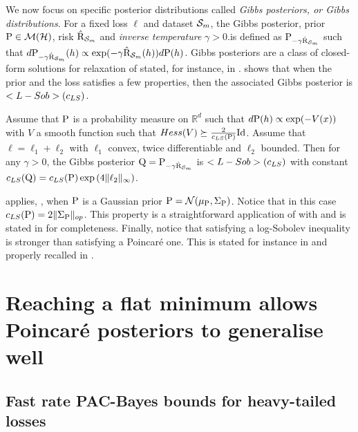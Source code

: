 We now focus on specific posterior distributions called \emph{Gibbs posteriors, or Gibbs distributions}.
For a fixed loss $\ell$ and dataset $\S_m$, the Gibbs posterior, \wrt prior $\P\in\Mcal(\Hcal)$, risk $\hat{\Risk}_{\S_m}$ and \emph{inverse temperature} $\gamma>0$.is defined as $\P_{-\gamma \hat{\Risk}_{\S_m}}$ such that  $d\P_{-\gamma \hat{\Risk}_{\S_m}}(h)\propto \exp( - \gamma \hat{\Risk}_{\S_m}(h) ) d\P(h)$. 
Gibbs posteriors are a class of closed-form solutions for relaxation of \citet[Theorem 1.2.6]{catoni2007pac} stated, for instance, in \citet[Theorem 4.1]{alquier2016properties}. 
 shows that when the prior and the loss satisfies a few properties, then the associated Gibbs posterior is $\Lsob(c_{LS})$.

\begin{proposition}\label{prop:gibbs_logsob}
Assume that $\P$ is a probability measure on $\mathbb{R}^d$ such that $d\P(h) \propto \exp(-V(x))$ with $V$ a smooth function such that $Hess(V)\succeq \frac{2}{c_{LS}(\P)}\mathrm{Id}$.
Assume that $\ell= \ell_1 + \ell_2$ with $\ell_1$ convex, twice differentiable and $\ell_2$ bounded. 
Then for any $\gamma>0$, the Gibbs posterior $\Q= \P_{-\gamma\hat{\Risk}_{\S_m}}$ is $\Lsob(c_{LS})$ with constant $c_{LS}(\Q)= c_{LS}(\P)\exp\LP 4\|\ell_2\|_{\infty}\RP $.
\end{proposition}
 applies, \eg, when $\P$ is a Gaussian prior $\P=\Ncal(\mu_\P,\Sigma_\P)$. Notice that in this case $c_{LS}(\P)= 2\|\Sigma_\P\|_{op}$. This property is a straightforward application of \citet[Corollary 2.1]{chafai2004entropies} with \citet[Property 2.6]{guionnet2003lectures} and is stated in  for completeness.
Finally, notice that satisfying a log-Sobolev inequality is stronger than satisfying a Poincaré one. This is stated for instance in \citet[Proposition 2.1]{ledoux2006concentration} and properly recalled in . 

\section{Reaching a flat minimum allows Poincaré posteriors to generalise well}
\label{sec:poincare_gauss}

\subsection{Fast rate PAC-Bayes bounds for heavy-tailed losses}  
\label{sec:fast_rates_gradient_h}


